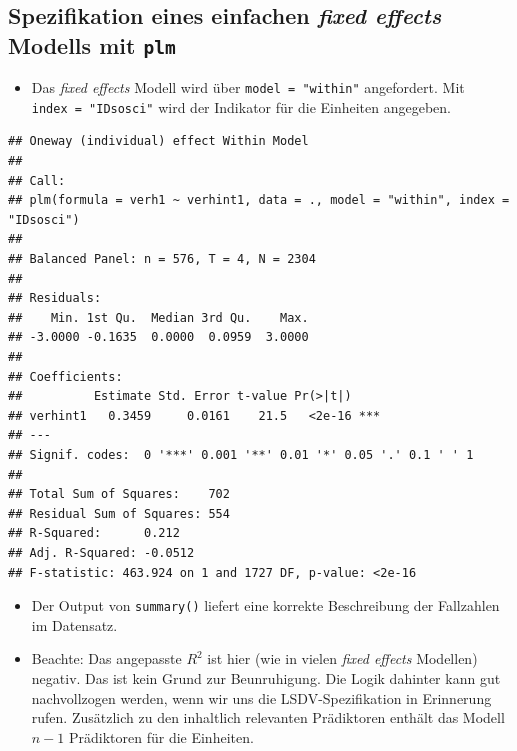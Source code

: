 \documentclass[
]{book}
\newenvironment{Shaded}{\begin{snugshade}}{\end{snugshade}}
\newcommand{\DataTypeTok}[1]{\textcolor[rgb]{0.13,0.29,0.53}{#1}}
\newcommand{\KeywordTok}[1]{\textcolor[rgb]{0.13,0.29,0.53}{\textbf{#1}}}
\newcommand{\NormalTok}[1]{#1}
\newcommand{\OperatorTok}[1]{\textcolor[rgb]{0.81,0.36,0.00}{\textbf{#1}}}
\newcommand{\StringTok}[1]{\textcolor[rgb]{0.31,0.60,0.02}{#1}}
\providecommand{\tightlist}{%
  \setlength{\itemsep}{0pt}\setlength{\parskip}{0pt}}
\begin{document}
\hypertarget{spezifikation-eines-einfachen-fixed-effects-modells-mit-plm}{%
\subsection*{\texorpdfstring{Spezifikation eines einfachen \emph{fixed effects} Modells mit \texttt{plm}}{Spezifikation eines einfachen fixed effects Modells mit plm}}\label{spezifikation-eines-einfachen-fixed-effects-modells-mit-plm}}

\begin{itemize}
\tightlist
\item
  Das \emph{fixed effects} Modell wird über \texttt{model\ =\ "within"} angefordert. Mit \texttt{index\ =\ "IDsosci"} wird der Indikator für die Einheiten angegeben.
\end{itemize}

\begin{Shaded}
\end{Shaded}

\begin{verbatim}
## Oneway (individual) effect Within Model
## 
## Call:
## plm(formula = verh1 ~ verhint1, data = ., model = "within", index = "IDsosci")
## 
## Balanced Panel: n = 576, T = 4, N = 2304
## 
## Residuals:
##    Min. 1st Qu.  Median 3rd Qu.    Max. 
## -3.0000 -0.1635  0.0000  0.0959  3.0000 
## 
## Coefficients:
##          Estimate Std. Error t-value Pr(>|t|)    
## verhint1   0.3459     0.0161    21.5   <2e-16 ***
## ---
## Signif. codes:  0 '***' 0.001 '**' 0.01 '*' 0.05 '.' 0.1 ' ' 1
## 
## Total Sum of Squares:    702
## Residual Sum of Squares: 554
## R-Squared:      0.212
## Adj. R-Squared: -0.0512
## F-statistic: 463.924 on 1 and 1727 DF, p-value: <2e-16
\end{verbatim}

\begin{itemize}
\tightlist
\item
  Der Output von \texttt{summary()} liefert eine korrekte Beschreibung der Fallzahlen im Datensatz.
\item
  Beachte: Das angepasste \(R^2\) ist hier (wie in vielen \emph{fixed effects} Modellen) negativ. Das ist kein Grund zur Beunruhigung. Die Logik dahinter kann gut nachvollzogen werden, wenn wir uns die LSDV-Spezifikation in Erinnerung rufen. Zusätzlich zu den inhaltlich relevanten Prädiktoren enthält das Modell \(n - 1\) Prädiktoren für die Einheiten.
\end{itemize}
\end{document}
